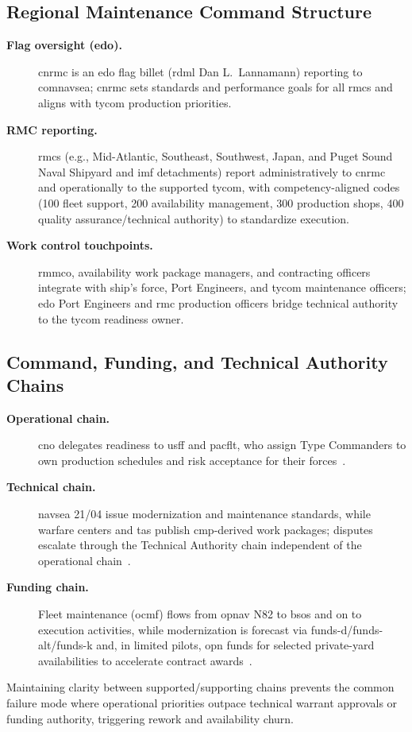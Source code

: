 \documentclass[../main.tex]{subfiles}
\begin{document}
\subsection{Regional Maintenance Command Structure}
\begin{description}
\item[\textbf{Flag oversight (\ac{edo}).}] \ac{cnrmc} is an \ac{edo} flag billet (\ac{rdml} Dan L.\ Lannamann) reporting to \ac{comnavsea}; \ac{cnrmc} sets standards and performance goals for all \acp{rmc} and aligns with \ac{tycom} production priorities\autocite{navy-lannamann-2025,NAVSEAINST5450-145A}.
\item[\textbf{RMC reporting.}] \acp{rmc} (e.g., Mid-Atlantic, Southeast, Southwest, Japan, and Puget Sound Naval Shipyard and \ac{imf} detachments) report administratively to \ac{cnrmc} and operationally to the supported \ac{tycom}, with competency-aligned codes (100 fleet support, 200 availability management, 300 production shops, 400 quality assurance/technical authority) to standardize execution\autocite{NAVSEAINST5450-145A}.
\item[\textbf{Work control touchpoints.}] \ac{rmmco}, availability work package managers, and contracting officers integrate with ship's force, Port Engineers, and \ac{tycom} maintenance officers; \ac{edo} Port Engineers and \ac{rmc} production officers bridge technical authority to the \ac{tycom} readiness owner\autocite{NAVSEAINST5450-145A,edo-4-1-1-fleet-maint-assets-2025}.
\end{description}

\clearpage
\subsection{Command, Funding, and Technical Authority Chains}
\begin{description}
  \item[\textbf{Operational chain.}] \ac{cno} delegates readiness to \ac{usff} and \ac{pacflt}, who assign Type Commanders to own production schedules and risk acceptance for their forces~\autocite{OPNAVINST4700-7M}.
  \item[\textbf{Technical chain.}] \ac{navsea} 21/04 issue modernization and maintenance standards, while warfare centers and \acp{ta} publish \ac{cmp}-derived work packages; disputes escalate through the Technical Authority chain independent of the operational chain~\autocite{OPNAVINST4700-7M,NAVSEAINST5450-145A}.
  \item[\textbf{Funding chain.}] Fleet maintenance (\ac{ocmf}) flows from \ac{opnav} N82 to \ac{bso}s and on to execution activities, while modernization is forecast via \ac{funds-d}/\ac{funds-alt}/\ac{funds-k} and, in limited pilots, \ac{opn} funds for selected private-yard availabilities to accelerate contract awards~\autocite{edo-4-1-1-fleet-maint-assets-2025,DoDFMR-Vol3}.
\end{description}
Maintaining clarity between supported/supporting chains prevents the common failure mode where operational priorities outpace technical warrant approvals or funding authority, triggering rework and availability churn.
\end{document}
